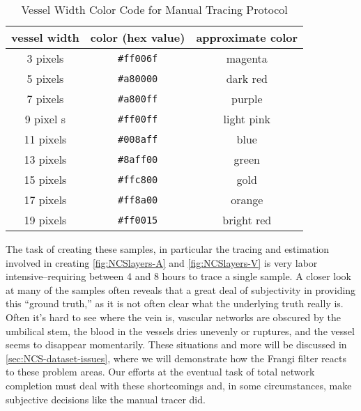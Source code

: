 \begin{table}
  \caption{Vessel Width Color Code for Manual Tracing Protocol}
    \centering
\begin{tabular}{ccc}
    \hline
    \rule[-1ex]{0pt}{2.5ex}
    vessel width & color (hex value) & approximate color \\
    \hline 
    \rule[-1ex]{0pt}{2.5ex}
    3 pixels &  \texttt{\#ff006f} &   magenta \\                                      
    \rule[-1ex]{0pt}{2.5ex}
    5 pixels & \texttt{\#a80000}  & dark red \\                                      
    \rule[-1ex]{0pt}{2.5ex}
    7 pixels &  \texttt{\#a800ff} & purple \\                                          
    \rule[-1ex]{0pt}{2.5ex}
    9 pixel s&  \texttt{\#ff00ff}  & light pink \\
    \rule[-1ex]{0pt}{2.5ex}
    11 pixels &  \texttt{\#008aff} & blue \\                                          
    \rule[-1ex]{0pt}{2.5ex}
    13 pixels &  \texttt{\#8aff00} &   green \\                                        
    \rule[-1ex]{0pt}{2.5ex}
    15 pixels &  \texttt{\#ffc800} &  gold \\                                    
    \rule[-1ex]{0pt}{2.5ex}
    17 pixels & \texttt{\#ff8a00}  &  orange \\                                         
    \rule[-1ex]{0pt}{2.5ex}
    19 pixels & \texttt{\#ff0015}   &  bright red  \\
    \hline
\end{tabular}
\label{tab:widthcolors}
\end{table}


The task of creating these samples, in particular the tracing and estimation involved in creating \cref{fig:NCSlayers-A} and \cref{fig:NCSlayers-V} is very labor intensive--requiring between 4 and 8 hours to trace a single sample.
A closer look at many of the samples often reveals that a great deal of subjectivity in providing this ``ground truth,'' as it is not often clear what the underlying truth really is. Often it's hard to see where the vein is, vascular networks are obscured by the umbilical stem, the blood in the vessels dries unevenly or ruptures, and the vessel seems to disappear momentarily. These situations and more will be discussed in \cref{sec:NCS-dataset-issues}, where we will demonstrate how the Frangi filter reacts to these problem areas. Our efforts at the eventual task of total network completion must deal with these shortcomings and, in some circumstances, make subjective decisions like the manual tracer did.


